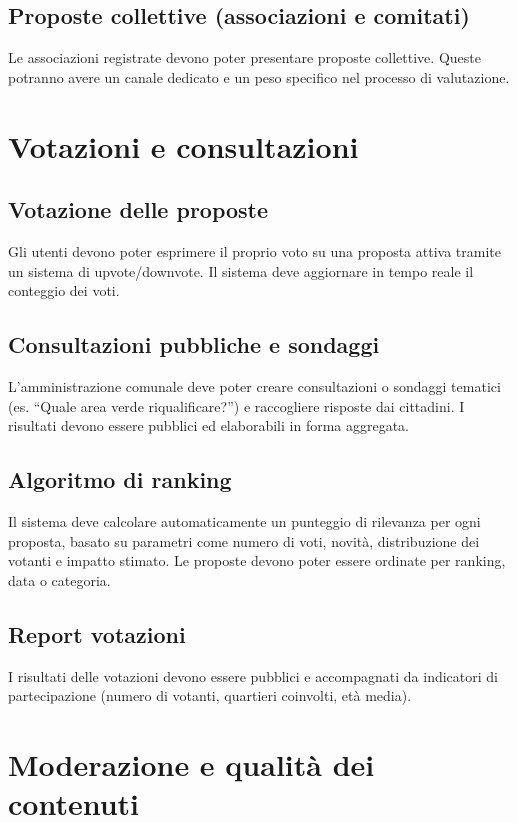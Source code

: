 \subsection{Proposte collettive (associazioni e comitati)}
Le associazioni registrate devono poter presentare proposte collettive.  
Queste potranno avere un canale dedicato e un peso specifico nel processo di valutazione.

\section{Votazioni e consultazioni}

\subsection{Votazione delle proposte}
Gli utenti devono poter esprimere il proprio voto su una proposta attiva tramite un sistema di upvote/downvote.  
Il sistema deve aggiornare in tempo reale il conteggio dei voti.

\subsection{Consultazioni pubbliche e sondaggi}
L’amministrazione comunale deve poter creare consultazioni o sondaggi tematici (es. “Quale area verde riqualificare?”) e raccogliere risposte dai cittadini.  
I risultati devono essere pubblici ed elaborabili in forma aggregata.

\subsection{Algoritmo di ranking}
Il sistema deve calcolare automaticamente un punteggio di rilevanza per ogni proposta, basato su parametri come numero di voti, novità, distribuzione dei votanti e impatto stimato.  
Le proposte devono poter essere ordinate per ranking, data o categoria.

\subsection{Report votazioni}
I risultati delle votazioni devono essere pubblici e accompagnati da indicatori di partecipazione (numero di votanti, quartieri coinvolti, età media).

\section{Moderazione e qualità dei contenuti}

